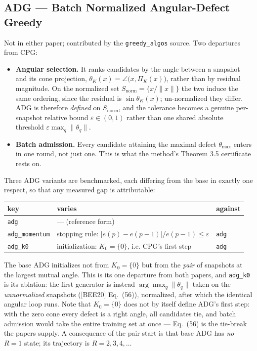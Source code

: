 \documentclass[11pt,a4paper]{article}
\newcommand{\bee}{\textsf{[BEE20]}}
\begin{document}
\subsection{ADG --- Batch Normalized Angular-Defect Greedy}\label{sec:adg}

Not in either paper; contributed by the \texttt{greedy\_algos} source. Two departures
from CPG:

\begin{itemize}
\item \textbf{Angular selection.} It ranks candidates by the angle between a snapshot and
its cone projection, $\theta_K(x) = \angle\bigl(x,\Pi_K(x)\bigr)$, rather than by residual
magnitude. On the normalized set $S_{\mathrm{norm}}=\{x/\|x\|\}$ the two induce the same
ordering, since the residual is $\sin\theta_K(x)$; un-normalized they differ. ADG is
therefore \emph{defined} on $S_{\mathrm{norm}}$, and the tolerance becomes a genuine
per-snapshot relative bound $\varepsilon\in(0,1)$ rather than one shared absolute
threshold $\varepsilon\max_q\|\theta_q\|$.
\item \textbf{Batch admission.} Every candidate attaining the maximal defect
$\theta_{\max}$ enters in one round, not just one. This is what the method's
Theorem 3.5 certificate rests on.
\end{itemize}

\noindent Three ADG variants are benchmarked, each differing from the base in exactly one
respect, so that any measured gap is attributable:

\begin{center}
\begin{tabular}{@{}lll@{}}
\toprule
key & varies & against \\
\midrule
\texttt{adg}          & --- (reference form) & \\
\texttt{adg\_momentum}& stopping rule: $|e(p)-e(p-1)|/e(p-1)\le\varepsilon$ & \texttt{adg} \\
\texttt{adg\_k0}      & initialization: $K_0=\{0\}$, i.e. CPG's first step & \texttt{adg} \\
\bottomrule
\end{tabular}
\end{center}

\noindent The base ADG initializes not from $K_0=\{0\}$ but from the \emph{pair} of
snapshots at the largest mutual angle. This is its one departure from both papers, and
\texttt{adg\_k0} is its ablation: the first generator is instead
$\arg\max_q\|\theta_q\|$ taken on the \emph{unnormalized} snapshots (\bee{} Eq.~(56)),
normalized, after which the identical angular loop runs. Note that $K_0=\{0\}$ does not
by itself define ADG's first step: with the zero cone every defect is a right angle, all
candidates tie, and batch admission would take the entire training set at once ---
Eq.~(56) is the tie-break the papers supply. A consequence of the pair start is that base
ADG has \emph{no} $R=1$ state; its trajectory is $R=2,3,4,\dots$
\end{document}
